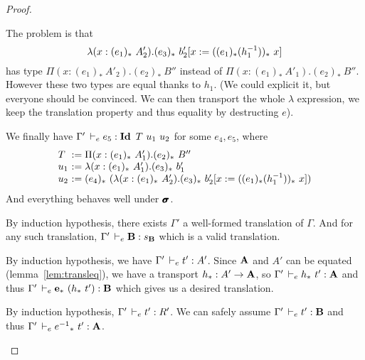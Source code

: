 \documentclass[a4paper,english]{lipics-utf8x}
\begin{document}
\begin{proof}
\begin{caselist}
      The problem is that
      \[
        \lambda (x : (e_1)_*\ A'_2). (e_3)_*\ b'_2[x := ((e_1)_* (h_1^{-1}))_*\ x]
      \]
      has type
      $\Pi (x : (e_1)_*\ A'_2). (e_2)_*\ B''$ instead of
      $\Pi (x : (e_1)_*\ A'_1). (e_2)_*\ B''$.
      However these two types are equal thanks to $h_1$.
      (We could explicit it, but everyone should be convinced. We can then
      transport the whole $\lambda$ expression, we keep the translation
      property and thus equality by destructing $e$).

      We finally have
      $\Gamma' \,\vdash_e e_5 : \operatorname{\mathbf{Id}~} T\ u_1\ u_2$ for some $e_4,e_5$,
      where
      \[
        \begin{array}{l@{~}l}
          T   &:= \Pi (x : (e_1)_*\ A'_1). (e_2)_*\ B'' \\
          u_1 &:= \lambda (x : (e_1)_*\ A'_1). (e_3)_*\ b'_1 \\
          u_2 &:= (e_4)_*\ %
                   (\lambda (x : (e_1)_*\ A'_2).
                    (e_3)_*\ b'_2[x := ((e_1)_* (h_1\inv))_*\ x])
        \end{array}
      \]
      And everything behaves well under $\operatorname{\pmb{\bm{\sigma}}}$.

      \nextcase
      \begin{mathc}
        \ru{\derr \Gamma
          }{\Gamma \derr \mR : \sB}
      \end{mathc}
      By induction hypothesis, there exists $\Gamma'$ a well-formed translation
      of $\Gamma$. And for any such translation, $\Gamma' \,\vdash_e \operatorname{\mathbf{B}} : s_{\operatorname{\mathbf{B}}}$
      which is a valid translation.

      \nextcase
      \begin{mathc}
      \end{mathc}
      By induction hypothesis, we have $\Gamma' \,\vdash_e t' : A'$.
      Since $\operatorname{\mathbf{A}}$ and $A'$ can be equated (lemma~\ref{lem:transleq}),
      we have a transport $h_* : A' \to \operatorname{\mathbf{A}}$, so
      $\Gamma' \,\vdash_e h_*\ t' : \operatorname{\mathbf{A}}$ and thus
      $\Gamma' \,\vdash_e \operatorname{\mathbf{e}}_*\ (h_*\ t') : \operatorname{\mathbf{B}}$ which gives us a desired
      translation.

      \nextcase
      \begin{mathc}
      \end{mathc}
      By induction hypothesis, $\Gamma' \,\vdash_e t' : R'$.
      We can safely assume $\Gamma' \,\vdash_e t' : \operatorname{\mathbf{B}}$ and thus
      $\Gamma' \,\vdash_e {e^{-1}}_*\ t' : \operatorname{\mathbf{A}}$.
    \end{caselist}
  \end{proof}
\end{document}
